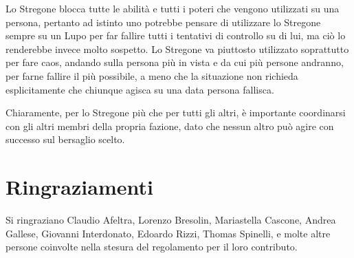 \documentclass[a4paper,10pt]{article}
\begin{document}
\begin{itemize}
	Lo Stregone blocca tutte le abilità e tutti i poteri che vengono utilizzati su una persona, pertanto ad istinto uno potrebbe pensare di utilizzare lo Stregone sempre su un Lupo per far fallire tutti i tentativi di controllo su di lui, ma ciò lo renderebbe invece molto sospetto. Lo Stregone va piuttosto utilizzato soprattutto per fare caos, andando sulla persona più in vista e da cui più persone andranno, per farne fallire il più possibile, a meno che la situazione non richieda esplicitamente che chiunque agisca su una data persona fallisca.
	
	Chiaramente, per lo Stregone più che per tutti gli altri, è importante coordinarsi con gli altri membri della propria fazione, dato che nessun altro può agire con successo sul bersaglio scelto.
\end{itemize}
    
\section{Ringraziamenti}

Si ringraziano Claudio Afeltra, Lorenzo Bresolin, Mariastella Cascone, Andrea Gallese, Giovanni Interdonato, Edoardo Rizzi, Thomas Spinelli, e molte altre persone coinvolte nella stesura del regolamento per il loro contributo.
\end{document}
